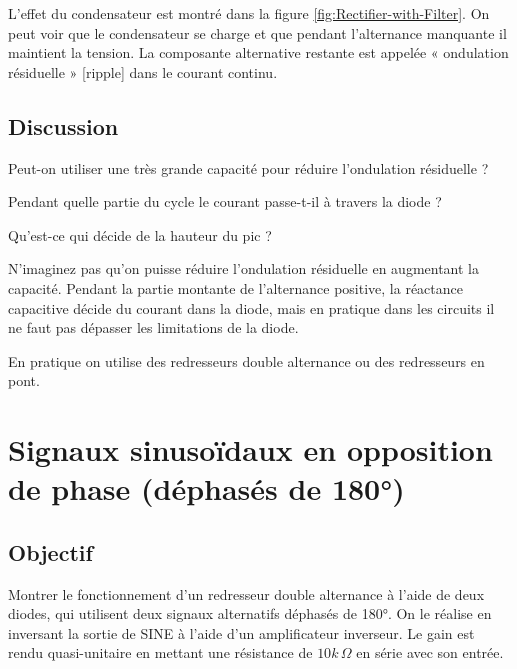 \documentclass{book}
\begin{document}
L'effet du condensateur est montré dans la figure  \ref{fig:Rectifier-with-Filter}. On peut voir que le condensateur se charge et que pendant l'alternance manquante il maintient la tension. La composante alternative restante est appelée « ondulation résiduelle » [ripple] dans le courant continu.

\subsection{Discussion}


Peut-on utiliser une très grande capacité pour réduire l'ondulation résiduelle ?



Pendant quelle partie du cycle le courant passe-t-il à travers la diode ?



Qu'est-ce qui décide de la hauteur du pic ?



N'imaginez pas qu'on puisse réduire l'ondulation résiduelle en augmentant la capacité. Pendant la partie montante de l'alternance positive, la réactance capacitive décide du courant dans la diode, mais en pratique dans les circuits il ne faut pas dépasser les limitations de la diode.



En pratique on utilise des redresseurs double alternance ou des redresseurs en pont.







\section{Signaux sinusoïdaux en opposition de phase (déphasés de 180°)}



\subsection{Objectif}


Montrer le fonctionnement d'un redresseur double alternance à l'aide de deux diodes, qui utilisent deux signaux alternatifs déphasés de 180°. On le réalise en inversant la sortie de SINE à l'aide d'un amplificateur inverseur. Le gain est rendu quasi-unitaire en mettant une résistance de $10k\,\Omega$ en série avec son entrée.
\end{document}
